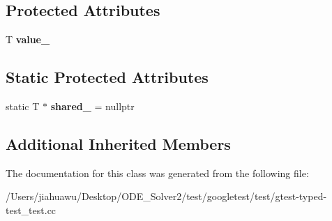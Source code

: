 \subsection*{Protected Attributes}
\begin{DoxyCompactItemize}
\item 
\mbox{\label{class_common_test_ae59c4abcb833625a7baeb2048531ebec}} 
T {\bfseries value\+\_\+}
\end{DoxyCompactItemize}
\subsection*{Static Protected Attributes}
\begin{DoxyCompactItemize}
\item 
\mbox{\label{class_common_test_a52368ce1e65a865db9bdccbcc2cedaac}} 
static T $\ast$ {\bfseries shared\+\_\+} = nullptr
\end{DoxyCompactItemize}
\subsection*{Additional Inherited Members}


The documentation for this class was generated from the following file\+:\begin{DoxyCompactItemize}
\item 
/\+Users/jiahuawu/\+Desktop/\+O\+D\+E\+\_\+\+Solver2/test/googletest/test/gtest-\/typed-\/test\+\_\+test.\+cc\end{DoxyCompactItemize}
